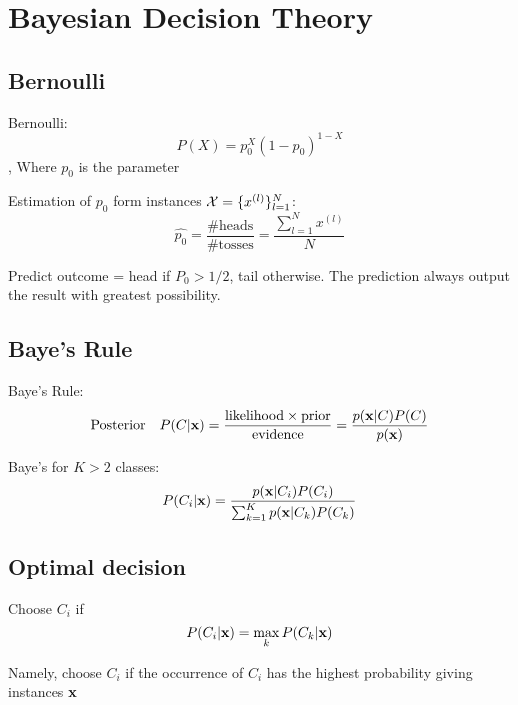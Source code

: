 \chapter{Bayesian Decision Theory}
\section{Bernoulli}
Bernoulli: \[P(X) = p_0^X(1-p_0)^{1-X}\], Where $p_0$ is the parameter

Estimation of $p_0$ form instances $\mathcal{X} = \{x^{(l)}\}^N_{l=1}$:
\[\hat{p_0} = \frac{\mbox{\#heads}}{\mbox{\#tosses}} =
\frac{\sum^N_{l=1}x^{(l)}}{N}\]

Predict outcome = head if $P_0 > 1/2$, tail otherwise. The prediction
always output the result with greatest possibility.
\section{Baye's Rule}
Baye's Rule:
\[\mbox{Posterior}\quad P(C|\mathbf{x}) = \frac{\mbox{likelihood}\times
\mbox{prior}}{\mbox{evidence}} = \frac{p(\mathbf{x}|C)P(C)}{p(\mathbf{x})} \]

Baye's for $K>2$ classes: 
\[P(C_i|\mathbf{x}) =  \frac{p(\mathbf{x}|C_i)P(C_i)}{\sum^K_{k=1}p(\mathbf{x}|C_k)P(C_k)}\]

\section{Optimal decision} 
Choose $C_i$ if 
\[P(C_i|\mathbf{x}) = \max_k P(C_k|\mathbf{x})\]

Namely, choose $C_i$ if the occurrence of $C_i$ has the highest
probability giving instances $\mathbf{x}$


